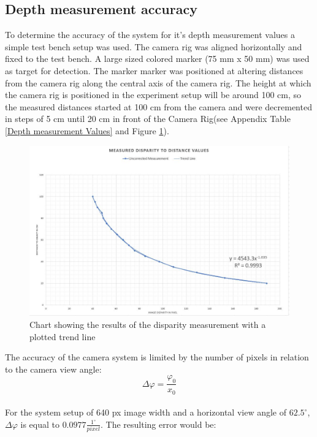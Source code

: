 \subsection{Depth measurement accuracy}
To determine the accuracy of the system for it's depth measurement values a simple test bench setup was used. The camera rig was aligned horizontally and fixed to the test bench. A large sized colored marker (75 mm x 50 mm) was used as target for detection. The marker marker was positioned at altering distances from the camera rig along the central axis of the camera rig. The height at which the camera rig is positioned in the experiment setup will be around 100 cm, so the measured distances started at 100 cm from the camera and were decremented in steps of 5 cm until 20 cm in front of the Camera Rig(see Appendix Table \ref{Depth measurement Values} and Figure \ref{char:DisparityToDistanceChart}).\\
\begin{figure}[H]
\includegraphics[width=\textwidth]{images/Disparity_to_distance.JPG}
\caption{Chart showing the results of the disparity measurement with a plotted trend line}
\label{char:DisparityToDistanceChart} 
\end{figure}
The accuracy of the camera system is limited by the number of pixels in relation to the camera view angle\cite{JernejMrovlje.2008}:\\
\begin{equation}
\Delta\varphi=\frac{\varphi_0}{x_0}
\end{equation}
\\
For the system setup of 640 px image width and a horizontal view angle of $62.5^\circ$, $\Delta\varphi$ is equal to $0.0977\frac{1^\circ}{pixel}$.
The resulting error would be:\\
